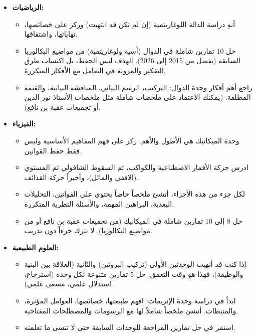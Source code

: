 \documentclass[12pt,a4paper]{book}
\begin{document}
	\begin{itemize}
		\item \textbf{الرياضيات:}
		\begin{itemize}
			\item أنهِ دراسة الدالة اللوغاريتمية (إن لم تكن قد انتهيت) وركز على خصائصها، نهاياتها، واشتقاقها.
			\item حل 10 تمارين شاملة في الدوال (أسية ولوغاريتمية) من مواضيع البكالوريا السابقة (يفضل من 2015 إلى 2026). الهدف ليس الحفظ، بل اكتساب طرق التفكير والمرونة في التعامل مع الأفكار المتكررة.
			\item راجع أهم أفكار وحدة الدوال: التركيب، الرسم البياني، المناقشة البيانية، والقيمة المطلقة. (يمكنك الاعتماد على ملخصات شاملة مثل ملخصات الأستاذ نور الدين أو تجميعات عقبة بن نافع).
		\end{itemize}
		
		\item \textbf{الفيزياء:}
		\begin{itemize}
			\item وحدة الميكانيك هي الأطول والأهم. ركز على فهم المفاهيم الأساسية وليس فقط حفظ القوانين.
			\item ادرس حركة الأقمار الاصطناعية والكواكب، ثم السقوط الشاقولي  ثم المستوي (الافقي والمائل)، وأخيراً حركة القذائف.
			\item لكل جزء من هذه الأجزاء، أنشئ ملخصاً خاصاً يحتوي على القوانين، التحليلات البعدية، البراهين المهمة، والأسئلة النظرية المتكررة.
			\item حل 8 إلى 10 تمارين شاملة في الميكانيك (من تجميعات عقبة بن نافع أو من مواضيع البكالوريا). لا تترك جزءاً دون تدريب.
		\end{itemize}
		
		\item \textbf{العلوم الطبيعية:}
		\begin{itemize}
			\item إذا كنت قد أنهيت الوحدتين الأولى (تركيب البروتين) والثانية (العلاقة بين البنية والوظيفة)، فهذا هو وقت التعمق. حل 5 تمارين متنوعة لكل وحدة (استرجاع، استدلال علمي، مسعى علمي).
			\item ابدأ في دراسة وحدة الإنزيمات: افهم طبيعتها، خصائصها، العوامل المؤثرة، والمثبطات. أنشئ ملخصاً شاملاً لها مع الرسومات  \newline والمصطلحات المفتاحية.
			\item استمر في حل تمارين المراجعة للوحدات السابقة حتى لا تنسى ما تعلمته.
		\end{itemize}
	\end{itemize}
	
\end{document}
